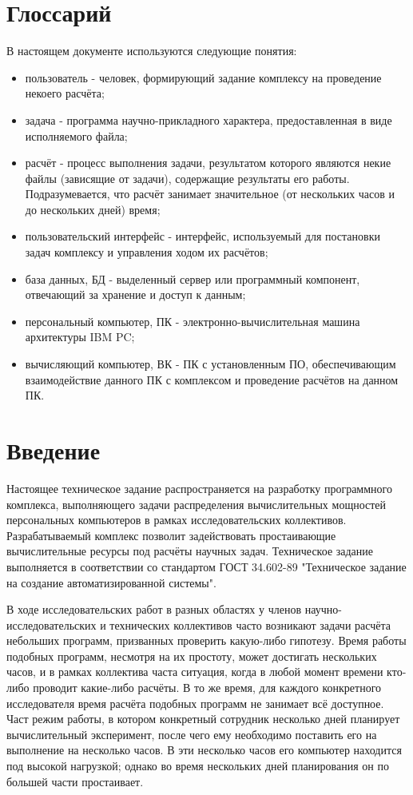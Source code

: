 \documentclass[a4paper,12pt]{report}
\date{\today}
\numberwithin{equation}{section}
\begin{document}
\section{Глоссарий}
В настоящем документе используются следующие понятия:
\begin{itemize}
  \item пользователь - человек, формирующий задание комплексу на проведение некоего расчёта;
  \item задача - программа научно-прикладного характера, предоставленная в виде исполняемого файла;
  \item расчёт - процесс выполнения задачи, результатом которого являются некие файлы (зависящие от задачи), содержащие результаты его работы. Подразумевается, что расчёт занимает значительное (от нескольких часов и до нескольких дней) время;
  \item пользовательский интерфейс - интерфейс, используемый для постановки задач комплексу и управления ходом их расчётов;
  \item база данных, БД - выделенный сервер или программный компонент, отвечающий за хранение и доступ к данным;
  \item персональный компьютер, ПК - электронно-вычислительная машина архитектуры IBM PC;
  \item вычисляющий компьютер, ВК - ПК с установленным ПО, обеспечивающим взаимодействие данного ПК с комплексом и проведение расчётов на данном ПК.
\end{itemize}

\section{Введение}

Настоящее техническое задание распространяется на разработку программного комплекса, выполняющего задачи распределения вычислительных мощностей персональных компьютеров в рамках исследовательских коллективов. Разрабатываемый комплекс позволит задействовать простаивающие вычислительные ресурсы под расчёты научных задач. Техническое задание выполняется в соответствии со стандартом ГОСТ 34.602-89 "Техническое задание на создание автоматизированной системы".

В ходе исследовательских работ в разных областях у членов научно-исследовательских и технических коллективов часто возникают задачи расчёта небольших программ, призванных проверить какую-либо гипотезу. 
Время работы подобных программ, несмотря на их простоту, может достигать нескольких часов, и в рамках коллектива часта ситуация, когда в любой момент времени кто-либо проводит какие-либо расчёты. 
В то же время, для каждого конкретного исследователя время расчёта подобных программ не занимает всё доступное. 
Част режим работы, в котором конкретный сотрудник несколько дней планирует вычислительный эксперимент, после чего ему необходимо поставить его на выполнение на несколько часов. 
В эти несколько часов его компьютер находится под высокой нагрузкой; однако во время нескольких дней планирования он по большей части простаивает.
\end{document}
